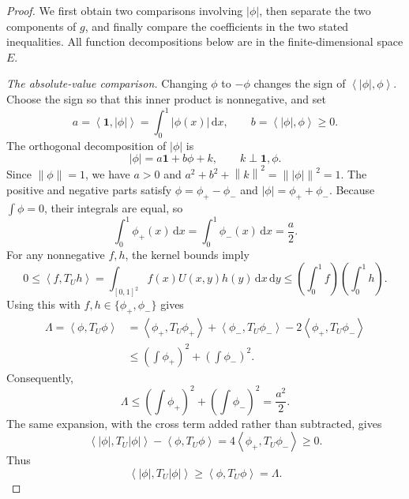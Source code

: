 \documentclass[11pt]{article}
\numberwithin{equation}{section}
\newcommand{\one}{\mathbf 1}
\newcommand{\norm}[1]{\left\lVert #1\right\rVert}
\newcommand{\ip}[2]{\left\langle #1,#2\right\rangle}
\newcommand{\dd}{\,\mathrm d}
\begin{document}
\begin{proof}
We first obtain two comparisons involving $|\phi|$, then separate
the two components of $g$, and finally compare the coefficients in
the two stated inequalities. All function decompositions below
are in the finite-dimensional space $E$.

\smallskip
\noindent\emph{The absolute-value comparison.}
Changing $\phi$ to $-\phi$ changes the sign of
$\ip{|\phi|}\phi$. Choose the sign so that this inner product is
nonnegative, and set
\[
 a=\ip\one{|\phi|}=\int_0^1|\phi(x)|\dd x,
 \qquad b=\ip{|\phi|}\phi\ge0.
\]
The orthogonal decomposition of $|\phi|$ is
\[
 |\phi|=a\one+b\phi+k,\qquad k\perp\one,\phi.
\]
Since $\norm\phi=1$, we have $a>0$ and
$a^2+b^2+\norm k^2=\norm{|\phi|}^2=1$.
The positive and negative parts satisfy
$\phi=\phi_+-\phi_-$ and $|\phi|=\phi_++\phi_-$.
Because $\int\phi=0$, their integrals are equal, so
\[
 \int_0^1\phi_+(x)\dd x
  =\int_0^1\phi_-(x)\dd x=\frac a2.
\]
For any nonnegative $f,h$, the kernel bounds imply
\[
 0\le\ip f{T_Uh}
   =\int_{[0,1]^2}f(x)U(x,y)h(y)\dd x\dd y
   \le\left(\int_0^1f\right)\left(\int_0^1h\right).
\]
Using this with $f,h\in\{\phi_+,\phi_-\}$ gives
\begin{align*}
 \Lambda=\ip\phi{T_U\phi}
 &=\ip{\phi_+}{T_U\phi_+}+\ip{\phi_-}{T_U\phi_-}
     -2\ip{\phi_+}{T_U\phi_-}\\
 &\le\left(\int\phi_+\right)^2
      +\left(\int\phi_-\right)^2.
\end{align*}
Consequently,
\begin{equation}\label{eq:alower}
 \Lambda\le\left(\int\phi_+\right)^2+\left(\int\phi_-\right)^2=\frac{a^2}{2}.
\end{equation}
The same expansion, with the cross term added rather than
subtracted, gives
\[
 \ip{|\phi|}{T_U|\phi|}-\ip\phi{T_U\phi}
   =4\ip{\phi_+}{T_U\phi_-}\ge0.
\]
Thus
\begin{equation}\label{eq:abs}
 \ip{|\phi|}{T_U|\phi|}\ge\ip\phi{T_U\phi}=\Lambda.
\end{equation}


\end{proof}
\end{document}
